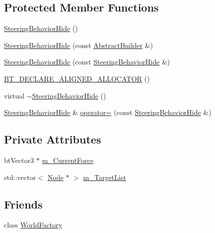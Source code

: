 \subsection*{Protected Member Functions}
\begin{DoxyCompactItemize}
\item 
\mbox{\hyperlink{classnjli_1_1_steering_behavior_hide_a596503d82f09ae0cf310d84667c1343c}{Steering\+Behavior\+Hide}} ()
\item 
\mbox{\hyperlink{classnjli_1_1_steering_behavior_hide_ab3fbea854a36406b3d331886e13ae603}{Steering\+Behavior\+Hide}} (const \mbox{\hyperlink{classnjli_1_1_abstract_builder}{Abstract\+Builder}} \&)
\item 
\mbox{\hyperlink{classnjli_1_1_steering_behavior_hide_a05cb6b889f3fcd47d21ba2f31d9f53da}{Steering\+Behavior\+Hide}} (const \mbox{\hyperlink{classnjli_1_1_steering_behavior_hide}{Steering\+Behavior\+Hide}} \&)
\item 
\mbox{\hyperlink{classnjli_1_1_steering_behavior_hide_aed997d461f2af6bd9210884904c809cd}{B\+T\+\_\+\+D\+E\+C\+L\+A\+R\+E\+\_\+\+A\+L\+I\+G\+N\+E\+D\+\_\+\+A\+L\+L\+O\+C\+A\+T\+OR}} ()
\item 
virtual \mbox{\hyperlink{classnjli_1_1_steering_behavior_hide_a17620743b747dac4bcfc7a4856c04106}{$\sim$\+Steering\+Behavior\+Hide}} ()
\item 
\mbox{\hyperlink{classnjli_1_1_steering_behavior_hide}{Steering\+Behavior\+Hide}} \& \mbox{\hyperlink{classnjli_1_1_steering_behavior_hide_ab1411a1ed83c0ce426ce4a5933b3432a}{operator=}} (const \mbox{\hyperlink{classnjli_1_1_steering_behavior_hide}{Steering\+Behavior\+Hide}} \&)
\end{DoxyCompactItemize}
\subsection*{Private Attributes}
\begin{DoxyCompactItemize}
\item 
bt\+Vector3 $\ast$ \mbox{\hyperlink{classnjli_1_1_steering_behavior_hide_a9d8827a9d2eb8b8cb059f1a920a4cc66}{m\+\_\+\+Current\+Force}}
\item 
std\+::vector$<$ \mbox{\hyperlink{classnjli_1_1_node}{Node}} $\ast$ $>$ \mbox{\hyperlink{classnjli_1_1_steering_behavior_hide_a6932c0546c4373a1e0b3f7d877f8123c}{m\+\_\+\+Target\+List}}
\end{DoxyCompactItemize}
\subsection*{Friends}
\begin{DoxyCompactItemize}
\item 
class \mbox{\hyperlink{classnjli_1_1_steering_behavior_hide_acb96ebb09abe8f2a37a915a842babfac}{World\+Factory}}
\end{DoxyCompactItemize}
